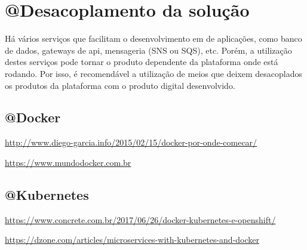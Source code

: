 \chapter{@Desacoplamento da solução}\label{desacoplamento-da-solucao}


Há vários serviços que facilitam o desenvolvimento em de aplicações, como banco de dados,
gateways de api, mensageria (SNS ou SQS), etc. Porém, a utilização destes serviços pode
tornar o produto dependente da plataforma onde está rodando. Por isso, é recomendável
a utilização de meios que deixem desacoplados os produtos da plataforma com o produto
digital desenvolvido.

\section{@Docker}\label{docker}

\url{http://www.diego-garcia.info/2015/02/15/docker-por-onde-comecar/}

\url{https://www.mundodocker.com.br}

\section{@Kubernetes}\label{kubernetes}

\url{https://www.concrete.com.br/2017/06/26/docker-kubernetes-e-openshift/}

\url{https://dzone.com/articles/microservices-with-kubernetes-and-docker}

